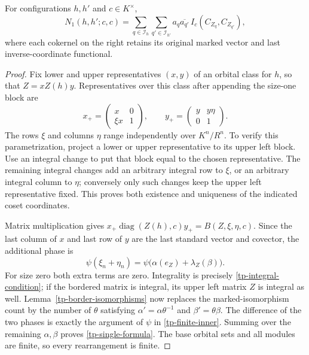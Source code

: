 \begin{proposition}\label{tp-explicit-single}
For configurations $h,h'$ and $c\in K^\times$,
\begin{equation}\label{tp-single-formula}
 N_1(h,h';c,c)=
 \sum_{q\in\mathcal I_h}\sum_{q'\in\mathcal I_{h'}}
       a_q\overline{a_{q'}}\,I_c(C_{Z_q},C_{Z_{q'}}),
\end{equation}
where each cokernel on the right retains its original marked
vector and last inverse-coordinate functional.
\end{proposition}

\begin{proof}
Fix lower and upper representatives $(x,y)$ of an orbital class
for $h$, so that $Z=xZ(h)y$. Representatives over this class
after appending the size-one block are
\[
 x_+=\begin{pmatrix}x&0\\ \xi x&1\end{pmatrix},\qquad
 y_+=\begin{pmatrix}y&y\eta\\0&1\end{pmatrix}.
\]
The rows $\xi$ and columns $\eta$ range independently over
$K^n/R^n$. To verify this parametrization, project a lower or
upper representative to its upper left block. Use an integral
change to put that block equal to the chosen representative.
The remaining integral changes add an arbitrary integral row
to $\xi$, or an arbitrary integral column to $\eta$; conversely
only such changes keep the upper left representative fixed.
This proves both existence and uniqueness of the indicated
coset coordinates.

Matrix multiplication gives
$x_+\operatorname{diag}(Z(h),c)y_+=B(Z,\xi,\eta,c)$.
Since the last column of $x$ and last row of $y$ are the last
standard vector and covector, the additional phase is
\[
 \psi(\xi_n+\eta_n)
       =\psi\bigl(\alpha(e_Z)+\lambda_Z(\beta)\bigr).
\]
For size zero both extra terms are zero. Integrality is precisely
\eqref{tp-integral-condition}; if the bordered matrix is integral,
its upper left matrix $Z$ is integral as well. Lemma~\ref{tp-border-isomorphisms}
now replaces the marked-isomorphism count by the number of
$\theta$ satisfying $\alpha'=\alpha\theta^{-1}$ and
$\beta'=\theta\beta$. The difference of the two phases is
exactly the argument of $\psi$ in \eqref{tp-finite-inner}.
Summing over the remaining $\alpha,\beta$ proves
\eqref{tp-single-formula}. The base orbital sets and all modules
are finite, so every rearrangement is finite.
\end{proof}

